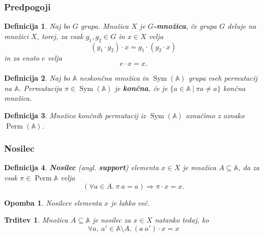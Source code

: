 \documentclass{beamer}
\DeclareMathOperator{\Sym}{Sym}
\DeclareMathOperator{\Perm}{Perm}
\newtheorem{trditev}{Trditev}
\newtheorem{definicija}{Definicija}
\newtheorem{opomba}{Opomba}
\begin{document}
\begin{frame}[fragile]
\frametitle{Predpogoji}

\begin{definicija}
    Naj bo \(G\) grupa. Množica \(X\) je \textbf{\(G\)-množica}, če grupa \(G\) deluje na množici \(X\), torej, za vsak \(g_1, g_2 \in G\) in \(x \in X\) velja
    \[
    (g_1 \cdot g_2) \cdot x = g_1 \cdot (g_2 \cdot x)
    \]
    in za enoto \(e\) velja
    \[
        e \cdot x = x.
    \]
\end{definicija}

\pause
\begin{definicija}
Naj bo \(\mathds{A}\) neskončna množica in \(\Sym(\mathds{A})\) grupa vseh permutacij na \(\mathds{A}\). Permutacija \(\pi \in \Sym(\mathds{A})\) je \textbf{končna}, če je \(\{a \in \mathds{A}\ |\ \pi a \neq a\}\) končna množica.
\end{definicija}

\begin{definicija}
Množico končnih permutacij iz \(\Sym(\mathds{A})\) označimo z oznako \(\Perm(\mathds{A})\).    
\end{definicija}


\end{frame}




\begin{frame}[fragile]
\frametitle{Nosilec}
\begin{definicija}

\textbf{Nosilec} (angl. \textbf{support}) elementa \(x \in X\) je množica \(A \subseteq \mathds{A}\), da za vsak \(\pi \in \Perm \mathds{A}\) velja
\[
    (\forall a \in A.\ \pi\ a = a) \Rightarrow \pi \cdot x = x.
\]
\end{definicija}
\begin{opomba}
    Nosilcev elementa \(x\) je lahko več.
\end{opomba}
\pause

\begin{trditev}
    Množica \(A \subseteq \mathds{A}\) je nosilec za \(x \in X\) natanko tedaj, ko 
    \[
        \forall a,\ a' \in \mathds{A}\setminus A.\ (a\ a') \cdot x = x
    \]
\end{trditev}


\end{frame}
\end{document}
